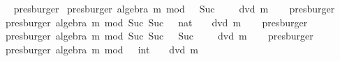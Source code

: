 \begin{isabellebody}
\isadelimproof
\ %
\endisadelimproof
%
\isatagproof
{}\isamarkupfalse%
\ presburger%
\endisatagproof
{\isafoldproof}%
%
\isadelimproof
%
\endisadelimproof
\isanewline
{}\isamarkupfalse%
\ {\isacharbrackleft}{\kern0pt}presburger{\isacharcomma}{\kern0pt}\ algebra{\isacharbrackright}{\kern0pt}{\isacharcolon}{\kern0pt}\ {\isachardoublequoteopen}m\ mod\ {}\ {\isacharequal}{\kern0pt}\ Suc\ {}\ {\isasymlongleftrightarrow}\ {\isasymnot}\ {}\ dvd\ m\ {\isachardoublequoteclose}%
\isadelimproof
\ %
\endisadelimproof
%
\isatagproof
{}\isamarkupfalse%
\ presburger%
\endisatagproof
{\isafoldproof}%
%
\isadelimproof
%
\endisadelimproof
\isanewline
{}\isamarkupfalse%
\ {\isacharbrackleft}{\kern0pt}presburger{\isacharcomma}{\kern0pt}\ algebra{\isacharbrackright}{\kern0pt}{\isacharcolon}{\kern0pt}\ {\isachardoublequoteopen}m\ mod\ {\isacharparenleft}{\kern0pt}Suc\ {\isacharparenleft}{\kern0pt}Suc\ {}{\isacharparenright}{\kern0pt}{\isacharparenright}{\kern0pt}\ {\isacharequal}{\kern0pt}\ {\isacharparenleft}{\kern0pt}{}{\isacharcolon}{\kern0pt}{\isacharcolon}{\kern0pt}nat{\isacharparenright}{\kern0pt}\ {\isasymlongleftrightarrow}\ {\isasymnot}\ {}\ dvd\ m\ {\isachardoublequoteclose}%
\isadelimproof
\ %
\endisadelimproof
%
\isatagproof
{}\isamarkupfalse%
\ presburger%
\endisatagproof
{\isafoldproof}%
%
\isadelimproof
%
\endisadelimproof
\isanewline
{}\isamarkupfalse%
\ {\isacharbrackleft}{\kern0pt}presburger{\isacharcomma}{\kern0pt}\ algebra{\isacharbrackright}{\kern0pt}{\isacharcolon}{\kern0pt}\ {\isachardoublequoteopen}m\ mod\ {\isacharparenleft}{\kern0pt}Suc\ {\isacharparenleft}{\kern0pt}Suc\ {}{\isacharparenright}{\kern0pt}{\isacharparenright}{\kern0pt}\ {\isacharequal}{\kern0pt}\ Suc\ {}\ {\isasymlongleftrightarrow}\ {\isasymnot}\ {}\ dvd\ m\ {\isachardoublequoteclose}%
\isadelimproof
\ %
\endisadelimproof
%
\isatagproof
{}\isamarkupfalse%
\ presburger%
\endisatagproof
{\isafoldproof}%
%
\isadelimproof
%
\endisadelimproof
\isanewline
{}\isamarkupfalse%
\ {\isacharbrackleft}{\kern0pt}presburger{\isacharcomma}{\kern0pt}\ algebra{\isacharbrackright}{\kern0pt}{\isacharcolon}{\kern0pt}\ {\isachardoublequoteopen}m\ mod\ {}\ {\isacharequal}{\kern0pt}\ {\isacharparenleft}{\kern0pt}{}{\isacharcolon}{\kern0pt}{\isacharcolon}{\kern0pt}int{\isacharparenright}{\kern0pt}\ {\isasymlongleftrightarrow}\ {\isasymnot}\ {}\ dvd\ m\ {\isachardoublequoteclose}%

\end{isabellebody}
